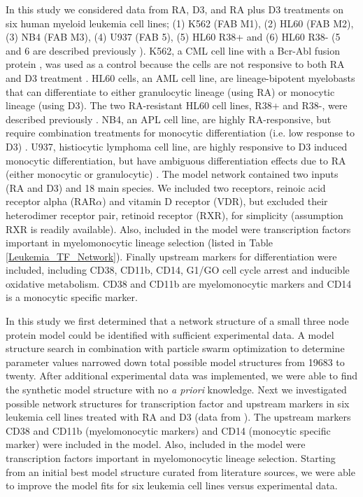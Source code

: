 \documentclass[12pt]{article}
\begin{document}
In this study we considered data from RA, D3, and RA plus D3 treatments on six human myeloid leukemia cell lines; (1) K562 (FAB M1), (2) HL60 (FAB M2), (3) NB4 (FAB M3), (4) U937 (FAB 5), (5) HL60 R38+ and (6) HL60 R38- (5 and 6 are described previously \cite{Jensen2013}). 
K562, a CML cell line with a Bcr-Abl fusion protein \cite{Lozzio1975}, was used as a control because the cells are not responsive to both RA \cite{Robertson1991} and D3 treatment \cite{Munker1986}. 
HL60 cells, an AML cell line, are lineage-bipotent myelobasts \cite{Fontana1981,Dalton1988} that can differentiate to either granulocytic lineage (using RA) or monocytic lineage (using D3). 
The two RA-resistant HL60 cell lines, R38+ and R38-, were described previously \cite{Jensen2013,Jensen2014}.
NB4, an APL cell line, are highly RA-responsive, but require combination treatments for monocytic differentiation (i.e. low response to D3) \cite{Bhatia1994,Testa1994}.
U937, histiocytic lymphoma cell line, are highly responsive to D3 induced monocytic differentiation, but have ambiguous differentiation effects due to RA (either monocytic or granulocytic) \cite{Olsson1982, Nakajima1996, Defacque1995}.
The model network contained two inputs (RA and D3) and 18 main species. 
We included two receptors, reinoic acid receptor alpha (RAR$\alpha$) and vitamin D receptor (VDR), but excluded their heterodimer receptor pair, retinoid receptor (RXR), for simplicity (assumption RXR is readily available). 
Also, included in the model were transcription factors important in myelomonocytic lineage selection (listed in Table \ref{Leukemia_TF_Network}). 
Finally upstream markers for differentiation were included, including CD38, CD11b, CD14, G1/GO cell cycle arrest and inducible oxidative metabolism. 
CD38 and CD11b are myelomonocytic markers and CD14 is a monocytic specific marker. 

In this study we first determined that a network structure of a small three node protein model could be identified with sufficient experimental data. 
A model structure search in combination with particle swarm optimization to determine parameter values narrowed down total possible model structures from 19683 to twenty. 
After additional experimental data was implemented, we were able to find the synthetic model structure with no \textit{a priori} knowledge. 
Next we investigated possible network structures for transcription factor and upstream markers in six leukemia cell lines treated with RA and D3 (data from \cite{Jensen2015}). 
The upstream markers CD38 and CD11b (myelomonocytic markers) and CD14 (monocytic specific marker) were included in the model.  
Also, included in the model were transcription factors important in myelomonocytic lineage selection.
Starting from an initial best model structure curated from literature sources, we were able to improve the model fits for six leukemia cell lines versus experimental data.  
\end{document}
